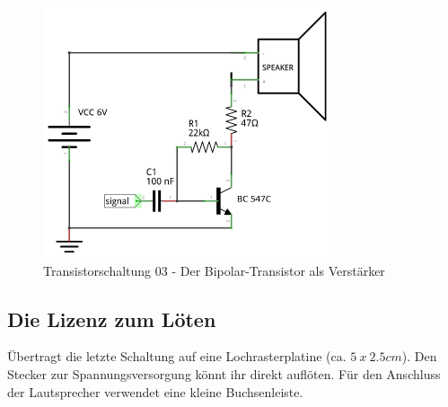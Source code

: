 \begin{figure}[H]
	\centering
	\includegraphics[scale=1.6]{Transistor/Schaltungen/NPN_Verstaerker.pdf}
	\caption{Transistorschaltung 03 - Der Bipolar-Transistor als Verstärker}
	\label{s03}
\end{figure}


\subsection{Die Lizenz zum Löten}

Übertragt die letzte Schaltung auf eine Lochrasterplatine (ca. $5~x~2.5 cm$).
Den Stecker zur Spannungsversorgung könnt ihr direkt auflöten. Für den Anschluss
der Lautsprecher verwendet eine kleine Buchsenleiste.
